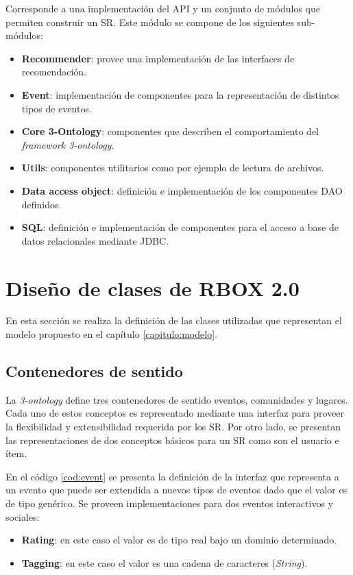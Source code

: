 Corresponde a una implementación del API y un conjunto de módulos que permiten construir un SR. Este módulo se compone de los siguientes sub-módulos:

\begin{itemize}
	\item \textbf{Recommender}: provee una implementación de las interfaces de recomendación.
	\item \textbf{Event}: implementación de componentes para la representación de distintos tipos de eventos.
	\item \textbf{Core 3-Ontology}: componentes que describen el comportamiento del \textit{framework 3-ontology}.
	\item \textbf{Utils}:  componentes utilitarios como por ejemplo de lectura de archivos. 
	\item \textbf{Data access object}: definición e implementación de los componentes DAO definidos.
	\item \textbf{SQL}: definición e implementación de componentes para el acceso a base de datos relacionales mediante JDBC.
	\end{itemize}

\section{Diseño de clases de RBOX 2.0}

En esta sección se realiza la definición de las clases utilizadas que representan el modelo propuesto en el capítulo \ref{capitulo:modelo}.

\subsection{Contenedores de sentido}

La \textit{3-ontology} define tres contenedores de sentido eventos, comunidades y lugares. Cada uno de estos conceptos es representado mediante una interfaz para proveer la flexibilidad y extensibilidad requerida por los SR. Por otro lado, se presentan las representaciones de dos conceptos básicos para un SR como son el usuario e ítem.

En el código \ref{cod:event} se presenta la definición de la  interfaz que representa a un evento que puede ser extendida a nuevos tipos de eventos dado que el valor es de tipo genérico. Se proveen implementaciones para dos eventos interactivos y sociales:

\begin{itemize}
	\item \textbf{Rating}: en este caso el valor es de tipo real bajo un dominio determinado.
	\item \textbf{Tagging}: en este caso el valor es una cadena de caracteres (\textit{String}).
\end{itemize}


